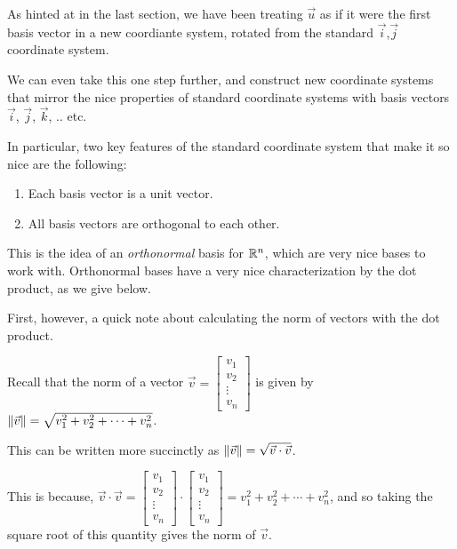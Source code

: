 \documentclass{ximera}
\begin{document}
As hinted at in the last section, we have been treating $\vec{u}$ as if it were the first basis vector in a new coordiante system, rotated from the standard $\vec{i}$,$\vec{j}$ coordinate system.

We can even take this one step further, and construct new coordinate systems that mirror the nice properties of standard coordinate systems with basis vectors $\vec{i}$, $\vec{j}$, $\vec{k}$, .. etc. 

In particular, two key features of the standard coordinate system that make it so nice are the following:

\begin{enumerate}
   \item Each basis vector is a unit vector.
   \item All basis vectors are orthogonal to each other.
\end{enumerate}

This is the idea of an \emph{orthonormal} basis for $\mathbb{R}^n$, which are very nice bases to work with. Orthonormal bases have a very nice characterization by the dot product, as we give below.

First, however, a quick note about calculating the norm of vectors with the dot product.

\begin{remark}

   Recall that the norm of a vector $\vec{v}=\begin{bmatrix}
      v_1\\v_2\\\vdots\\v_n
   \end{bmatrix}$ is given by $\left\|\vec{v}\right\|=\sqrt{v_1^2+v_2^2+\cdots+v_n^2}$. 

   This can be written more succinctly as $\left\|\vec{v}\right\|=\sqrt{\vec{v}\cdot\vec{v}}$.

   This is because, $\vec{v}\cdot\vec{v}=\begin{bmatrix}
      v_1\\v_2\\\vdots\\v_n
   \end{bmatrix}\cdot\begin{bmatrix}
      v_1\\v_2\\\vdots\\v_n
   \end{bmatrix}=v_1^2+v_2^2+\cdots+v_n^2$, and so taking the square root of this quantity gives the norm of $\vec{v}$.
\end{remark}
\end{document}
